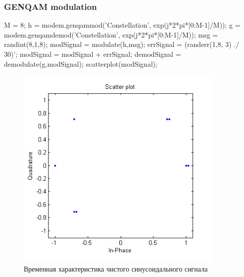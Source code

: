 \documentclass[10pt,a4paper]{article}
\begin{document}
\subsubsection{GENQAM modulation}
M = 8; \newline
h = modem.genqammod('Constellation', exp(j*2*pi*[0:M-1]/M)); \newline
g = modem.genqamdemod('Constellation', exp(j*2*pi*[0:M-1]/M)); \newline
msg = randint(8,1,8);\newline 
modSignal = modulate(h,msg); \newline
errSignal = (randerr(1,8, 3) ./ 30)';\newline 
modSignal = modSignal + errSignal; \newline
demodSignal = demodulate(g,modSignal); \newline
scatterplot(modSignal);\newline
\begin{figure}[h]
\centering
\includegraphics[width=10cm]{1_4.png} 
\caption{Временная характеристика чистого синусоидального сигнала} 
\end{figure}
\newpage
\FloatBarrier
\end{document}

